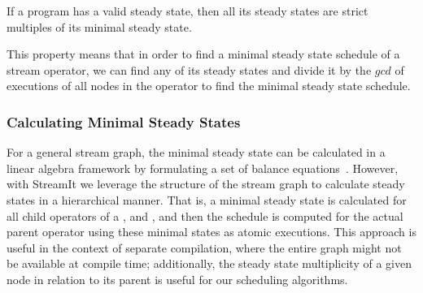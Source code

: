 \begin{theorem} If a
{\StreamIt} program has a valid steady state, then all its steady
states are strict multiples of its minimal steady state.
\label{thm:multiplicity}
\end{theorem}

\begin{comment}
\begin{proof}[Multiplicity of Minimal Steady State]
Assume that there exists a steady state that is not a multiple of
the minimal steady state.  Let $m$ denote the minimal steady
state. Let $q$ denote the other steady state.  Note that $w = q -
m$ is still a steady state, as long as all elements of $w$ remain
non-negative (by Corollary \ref{corollary:composition}).  Repeat
subtracting $m$ from $q$ until no more subtractions can be
performed without generating at least one negative element in
vector $w$.  Since $q$ is not a multiple of $m$, $w \ne 0$. But
since we cannot subtract $m$ from $w$ any further, $\exists i, m_i
> w_i$.  Since $m$ is a minimal steady state and $w$ is a steady
state, this is impossible due to Corollary
\ref{corollary:minimal-state}. Thus there are no steady states
that are not multiples of the minimal steady schedule.
\end{proof}
\end{comment}

This property means that in order to find a minimal steady state
schedule of a stream operator, we can find any of its steady states
and divide it by the $gcd$ of executions of all nodes in the operator
to find the minimal steady state schedule.

\subsubsection{Calculating Minimal Steady States}
\label{sec:calc-min-steady}

For a general stream graph, the minimal steady state can be calculated
in a linear algebra framework by formulating a set of balance
equations~\cite{lee87static}.  However, with StreamIt we leverage the
structure of the stream graph to calculate steady states in a
hierarchical manner.  That is, a minimal steady state is calculated
for all child operators of a {\pipeline}, {\splitjoin} and
{\feedbackloop}, and then the schedule is computed for the actual
parent operator using these minimal states as atomic executions.  This
approach is useful in the context of separate compilation, where the
entire graph might not be available at compile time; additionally, the
steady state multiplicity of a given node in relation to its parent is
useful for our scheduling algorithms.

